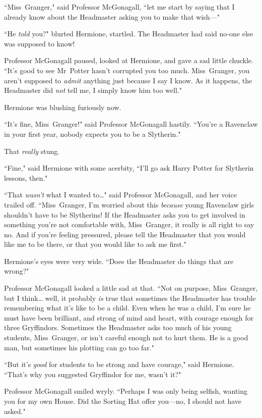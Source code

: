 ``Miss~Granger," said Professor McGonagall, ``let me start by saying that I already know about the Headmaster asking you to make that wish—"

``He \emph{told} you?" blurted Hermione, startled. The Headmaster had said no-one else was supposed to know!

Professor McGonagall paused, looked at Hermione, and gave a sad little chuckle. ``It's good to see Mr~Potter hasn't corrupted you too much. Miss~Granger, you aren't supposed to \emph{admit} anything just because I say I know. As it happens, the Headmaster did \emph{not} tell me, I simply know him too well."

Hermione was blushing furiously now.

``It's fine, Miss~Granger!" said Professor McGonagall hastily. ``You're a Ravenclaw in your first year, nobody expects you to be a Slytherin."

That \emph{really} stung.

``Fine," said Hermione with some acerbity, ``I'll go ask Harry Potter for Slytherin lessons, then."

``That \emph{wasn't} what I wanted to{\ldots}" said Professor McGonagall, and her voice trailed off. ``Miss~Granger, I'm worried about this \emph{because} young Ravenclaw girls shouldn't have to be Slytherins! If the Headmaster asks you to get involved in something you're not comfortable with, Miss~Granger, it really is all right to say no. And if you're feeling pressured, please tell the Headmaster that you would like me to be there, or that you would like to ask me first."

Hermione's eyes were very wide. ``Does the Headmaster do things that are wrong?"

Professor McGonagall looked a little sad at that. ``Not on purpose, Miss~Granger, but I think{\ldots} well, it probably \emph{is} true that sometimes the Headmaster has trouble remembering what it's like to be a child. Even when he was a child, I'm sure he must have been brilliant, and strong of mind and heart, with courage enough for three Gryffindors. Sometimes the Headmaster asks too much of his young students, Miss~Granger, or isn't careful enough not to hurt them. He is a good man, but sometimes his plotting can go too far."

``But it's \emph{good} for students to be strong and have courage," said Hermione. ``That's why you suggested Gryffindor for me, wasn't it?"

Professor McGonagall smiled wryly. ``Perhaps I was only being selfish, wanting you for my own House. Did the Sorting Hat offer you—no, I should not have asked."

